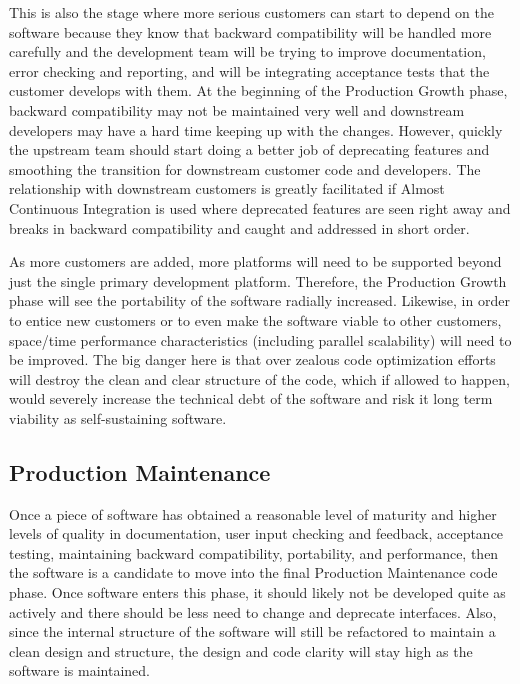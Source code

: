 \documentclass[11pt]{SANDreport}
\begin{document}
This is also the stage where more serious customers can start to
depend on the software because they know that backward compatibility
will be handled more carefully and the development team will be trying
to improve documentation, error checking and reporting, and will be
integrating acceptance tests that the customer develops with them.  At
the beginning of the Production Growth phase, backward compatibility
may not be maintained very well and downstream developers may have a
hard time keeping up with the changes.  However, quickly the upstream
team should start doing a better job of deprecating features and
smoothing the transition for downstream customer code and developers.
The relationship with downstream customers is greatly facilitated if
Almost Continuous Integration {}\cite{SoftwareIntegrationforCSE09} is
used where deprecated features are seen right away and breaks in
backward compatibility and caught and addressed in short order.

As more customers are added, more platforms will need to be supported
beyond just the single primary development platform.  Therefore, the
Production Growth phase will see the portability of the software
radially increased.  Likewise, in order to entice new customers or to
even make the software viable to other customers, space/time
performance characteristics (including parallel scalability) will need
to be improved.  The big danger here is that over zealous code
optimization efforts will destroy the clean and clear structure of the
code, which if allowed to happen, would severely increase the
technical debt of the software and risk it long term viability as
self-sustaining software.


%
{}\subsection{Production Maintenance}
%

Once a piece of software has obtained a reasonable level of maturity
and higher levels of quality in documentation, user input checking and
feedback, acceptance testing, maintaining backward compatibility,
portability, and performance, then the software is a candidate to move
into the final Production Maintenance code phase.  Once software
enters this phase, it should likely not be developed quite as actively
and there should be less need to change and deprecate interfaces.
Also, since the internal structure of the software will still be
refactored to maintain a clean design and structure, the design and
code clarity will stay high as the software is maintained.
\end{document}
